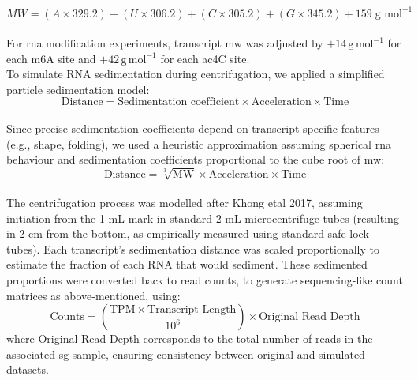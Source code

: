\begin{equation}
	MW = (A \times 329.2) + (U \times 306.2) + (C \times 305.2) + (G \times 345.2) + 159 \;\text{g mol}^{-1}
\end{equation}
\\
For \gls{rna} modification experiments, transcript \gls{mw} was adjusted by $+14\,\mathrm{g\,mol^{-1}}$ for each m6A site\cite{national_center_for_biotechnology_information_pubchem_2025} and $+42\,\mathrm{g\,mol^{-1}}$ for each ac4C site\cite{national_center_for_biotechnology_information_pubchem_2025-1}.
\\
\linebreak
\noindent
To simulate RNA sedimentation during centrifugation, we applied a simplified particle sedimentation model\cite{svedberg_ultracentrifuge_1940}: 
\begin{equation}
	\text{Distance} =
	\text{Sedimentation coefficient} \times
	\text{Acceleration} \times
	\text{Time}
\end{equation}
\\
Since precise sedimentation coefficients depend on transcript-specific features (e.g., shape, folding), we used a heuristic approximation\cite{balch_effects_2015} assuming spherical \gls{rna} behaviour and sedimentation coefficients proportional to the cube root of \gls{mw}: 
\begin{equation}
	\text{Distance} = \sqrt[3]{\text{MW}} \times \text{Acceleration} \times \text{Time}
\end{equation}
\\
The centrifugation process was modelled after Khong \gls{etal} 2017\cite{khong_stress_2017}, assuming initiation from the 1 mL mark in standard 2 mL microcentrifuge tubes (resulting in 2 cm from the bottom, as empirically measured using standard safe-lock tubes). Each transcript’s sedimentation distance was scaled proportionally to estimate the fraction of each RNA that would sediment. These sedimented proportions were converted back to read counts, to generate sequencing-like count matrices as above-mentioned, using:
\begin{equation}
	\text{Counts} =
	\left(
	\frac{\mathrm{TPM} \times \text{Transcript Length}}{10^{6}}
	\right)
	\times \text{Original Read Depth}
\end{equation}
\noindent
where Original Read Depth corresponds to the total number of reads in the associated \gls{sg} sample, ensuring consistency between original and simulated datasets.
